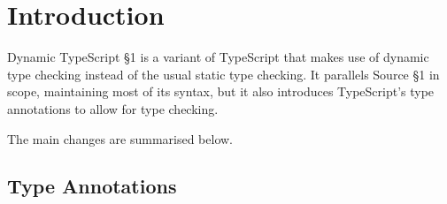 
\usepackage{geometry}


\newcommand{\Rule}[2]{\genfrac{}{}{0.7pt}{}{{\setlength{\fboxrule}{0pt}\setlength{\fboxsep}{3mm}\fbox{$#1$}}}{{\setlength{\fboxrule}{0pt}\setlength{\fboxsep}{3mm}\fbox{$#2$}}}}

\newcommand{\TruE}{\textbf{\texttt{true}}}
\newcommand{\FalsE}{\textbf{\texttt{false}}}
\newcommand{\Rc}{\texttt{\}}}
\newcommand{\Lc}{\texttt{\{}}
\newcommand{\Rp}{\texttt{)}}
\newcommand{\Lp}{\texttt{(}}
\newcommand{\Rb}{\texttt{>}}
\newcommand{\Lb}{\texttt{<}}
\newcommand{\Fun}{\textbf{\texttt{function}}}
\newcommand{\Let}{\textbf{\texttt{let}}}
\newcommand{\Return}{\textbf{\texttt{return}}}
\newcommand{\Const}{\textbf{\texttt{const}}}
\newcommand{\Type}{\textbf{\texttt{type}}}
\newcommand{\If}{\textbf{\texttt{if}}}
\newcommand{\Else}{\textbf{\texttt{else}}}
\newcommand{\Bool}{\texttt{bool}}
\newcommand{\Number}{\texttt{number}}
\newcommand{\String}{\texttt{string}}
\newcommand{\Undefined}{\texttt{undefined}}
\newcommand{\Void}{\texttt{void}} %
\newcommand{\Any}{\texttt{any}}
\newcommand{\Null}{\texttt{null}}

\newcommand{\DynamicTS}{Dynamic TypeScript \S 1}

\newcommand{\Eval}{\mapsto_{TS_D}}
\newcommand{\code}[1]{\textbf{\texttt{#1}}}

\newtheorem{definition}{Definition}[section]



\section{Introduction}

\DynamicTS{} is a variant of TypeScript that makes use of dynamic type checking instead of the usual static type checking. 
It parallels Source \S 1 in scope, maintaining most of its syntax, but it also introduces TypeScript's type annotations to allow for type checking.

The main changes are summarised below.

\subsection{Type Annotations}

